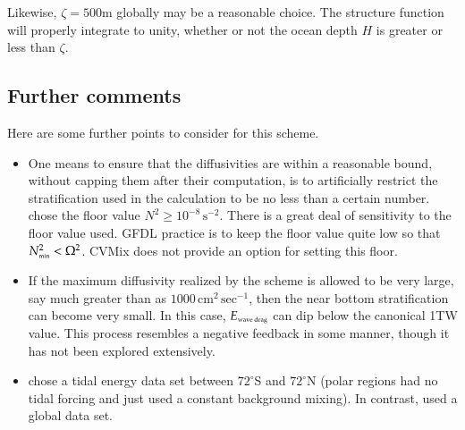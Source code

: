 Likewise, $\zeta = 500$m globally may be a reasonable choice. The
structure function will properly integrate to unity, whether or not
the ocean depth $H$ is greater or less than $\zeta$.

\subsection{Further comments} 

Here are some further points to consider for this scheme. 
\begin{itemize}

\item One means to ensure that the diffusivities are within a
  reasonable bound, without capping them after their computation, is
  to artificially restrict the stratification used in the calculation
  to be no less than a certain number.  \cite{Simmonsetal2004} chose
  the floor value $N^{2} \ge 10^{-8} \, \mbox{s}^{-2}$.  There is a
  great deal of sensitivity to the floor value used.  GFDL practice is
  to keep the floor value quite low so that $N^{2}_{\mbox{\tiny min}}
  < \Omega^{2}$.  CVMix does not provide an option for setting this
  floor.

\item If the maximum diffusivity realized by the scheme is allowed to
  be very large, say much greater than as $1000 \, \mbox{cm}^{2} \,
  \mbox{sec}^{-1}$, then the near bottom stratification can become
  very small.  In this case, $E_{\mbox{\tiny wave drag}}$ can dip
  below the canonical 1TW value.  This process resembles a negative
  feedback in some manner, though it has not been explored
  extensively.

\item \cite{Simmonsetal2004} chose a tidal energy data set between
  $72^{\circ}$S and $72^{\circ}$N (polar regions had no tidal forcing
  and just used a constant background mixing).  In contrast,
  \cite{Jayne2009} used a global data set.

\end{itemize}



